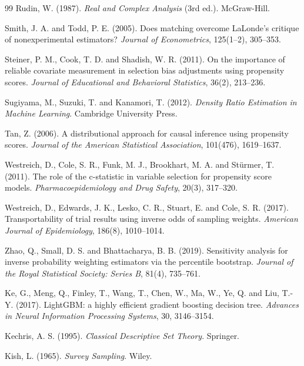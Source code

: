 \begin{thebibliography}{99}
 Rudin, W. (1987). \emph{Real and Complex Analysis} (3rd ed.). McGraw-Hill.

 Smith, J. A. and Todd, P. E. (2005). Does matching overcome LaLonde's critique of nonexperimental estimators? \emph{Journal of Econometrics}, 125(1--2), 305--353.

 Steiner, P. M., Cook, T. D. and Shadish, W. R. (2011). On the importance of reliable covariate measurement in selection bias adjustments using propensity scores. \emph{Journal of Educational and Behavioral Statistics}, 36(2), 213--236.

 Sugiyama, M., Suzuki, T. and Kanamori, T. (2012). \emph{Density Ratio Estimation in Machine Learning}. Cambridge University Press.

 Tan, Z. (2006). A distributional approach for causal inference using propensity scores. \emph{Journal of the American Statistical Association}, 101(476), 1619--1637.

 Westreich, D., Cole, S. R., Funk, M. J., Brookhart, M. A. and Stürmer, T. (2011). The role of the c-statistic in variable selection for propensity score models. \emph{Pharmacoepidemiology and Drug Safety}, 20(3), 317--320.

 Westreich, D., Edwards, J. K., Lesko, C. R., Stuart, E. and Cole, S. R. (2017). Transportability of trial results using inverse odds of sampling weights. \emph{American Journal of Epidemiology}, 186(8), 1010--1014.

 Zhao, Q., Small, D. S. and Bhattacharya, B. B. (2019). Sensitivity analysis for inverse probability weighting estimators via the percentile bootstrap. \emph{Journal of the Royal Statistical Society: Series B}, 81(4), 735--761.

 Ke, G., Meng, Q., Finley, T., Wang, T., Chen, W., Ma, W., Ye, Q. and Liu, T.-Y. (2017). LightGBM: a highly efficient gradient boosting decision tree. \emph{Advances in Neural Information Processing Systems}, 30, 3146--3154.

 Kechris, A. S. (1995). \emph{Classical Descriptive Set Theory}. Springer.

 Kish, L. (1965). \emph{Survey Sampling}. Wiley.


\end{thebibliography}
